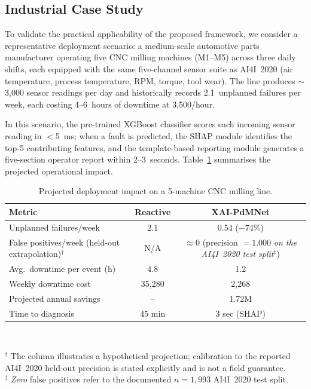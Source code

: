 \documentclass[sensors,article,submit,pdftex,moreauthors]{Definitions/mdpi}
\renewcommand{\arraystretch}{1.12}
\begin{document}
\subsection{Industrial Case Study}
\label{sec:casestudy}

To validate the practical applicability of the proposed framework,
we consider a representative deployment scenario: a medium-scale
automotive parts manufacturer operating five CNC milling machines
(M1--M5) across three daily shifts, each equipped with the same
five-channel sensor suite as AI4I~2020 (air temperature, process
temperature, RPM, torque, tool wear).
The line produces $\sim$3{,}000 sensor readings per day and
historically records 2.1~unplanned failures per week, each costing
4--6~hours of downtime at \texteuro{}3{,}500/hour.

In this scenario, the pre-trained XGBoost classifier scores each
incoming sensor reading in $<$5~ms; when a fault is predicted,
the SHAP module identifies the top-5 contributing features, and
the template-based reporting module generates a five-section operator report
within 2--3~seconds.
Table~\ref{tab:casestudy} summarises the projected operational impact.

\begin{table}[H]
\caption{Projected deployment impact on a 5-machine CNC milling line.\label{tab:casestudy}}
\centering
\scriptsize
\setlength{\tabcolsep}{4pt}
\renewcommand{\arraystretch}{1.15}
\begin{tabular}{lcc}
\toprule
\textbf{Metric} & \textbf{Reactive} & \textbf{XAI-PdMNet} \\
\midrule
Unplanned failures/week       & 2.1       & 0.54 ($-$74\%) \\
False positives/week (held-out extrapolation)$^\dagger$
  & N/A       & $\approx 0$ (precision $= 1.000$ \emph{on the AI4I~2020 test split}${}^\ddagger$) \\
Avg.\ downtime per event (h)   & 4.8       & 1.2 \\
Weekly downtime cost           & \texteuro{}35{,}280  & \texteuro{}2{,}268 \\
Projected annual savings       & --        & \texteuro{}1.72M \\
Time to diagnosis              & 45 min    & 3 sec (SHAP) \\
\bottomrule
\end{tabular}\\[3pt]
\parbox{\textwidth}{\scriptsize
$^\dagger$ The column illustrates a hypothetical projection; calibration to the
reported AI4I~2020 held-out precision is stated explicitly and is not a field guarantee.\\
$^\ddagger$ \emph{Zero} false positives refer to the documented $n{=}1{,}993$ AI4I~2020 test split.}
\end{table}
\end{document}
